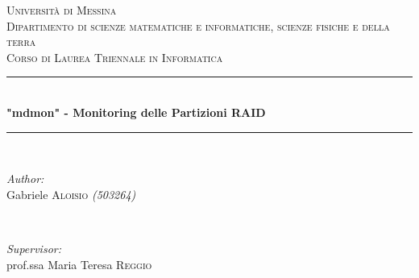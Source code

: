 \documentclass[11pt]{article}
\begin{document}
\begin{titlepage}

    \newcommand{\HRule}{\rule{\linewidth}{0.5mm}} %

    \center %


    \textsc{\LARGE Università di Messina}\\[1.5cm] %
    \textsc{\Large Dipartimento di scienze matematiche e informatiche, scienze fisiche e della terra}\\[0.5cm] %
    \textsc{\large Corso di Laurea Triennale in Informatica}\\[0.5cm] %


    \HRule \\[0.4cm]
    { \huge \bfseries "mdmon" - Monitoring delle Partizioni RAID}\\[0.4cm] %
    \HRule \\[1.5cm]


    \begin{minipage}{0.4\textwidth}
        \begin{flushleft} \large
            \emph{Author:}\\
            Gabriele \textsc{Aloisio} \textit{(503264)} \\
        \end{flushleft}
    \end{minipage}
    ~
    \begin{minipage}{0.4\textwidth}
        \begin{flushright} \large
            \emph{Supervisor:} \\
            prof.ssa Maria Teresa \textsc{Reggio} \\
        \end{flushright}
    \end{minipage}\\[2cm]


\end{titlepage}
\end{document}
